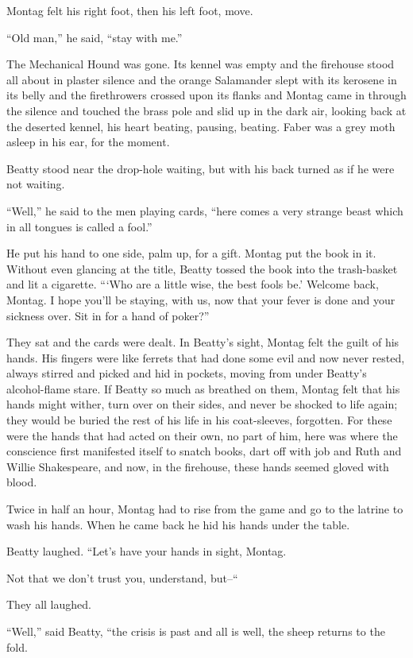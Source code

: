 \documentclass[11pt,openany]{book}
\begin{document}
Montag felt his right foot, then his left foot, move.

``Old man,'' he said, ``stay with me.''

The Mechanical Hound was gone. Its kennel was empty and the firehouse stood all about in plaster silence and the orange Salamander slept with its kerosene in its belly and the firethrowers crossed upon its flanks and Montag came in through the silence and touched the brass pole and slid up in the dark air, looking back at the deserted kennel, his heart beating, pausing, beating. Faber was a grey moth asleep in his ear, for the moment.

Beatty stood near the drop-hole waiting, but with his back turned as if he were not waiting.

``Well,'' he said to the men playing cards, ``here comes a very strange beast which in all tongues is called a fool.''

He put his hand to one side, palm up, for a gift. Montag put the book in it. Without even glancing at the title, Beatty tossed the book into the trash-basket and lit a cigarette. ```Who are a little wise, the best fools be.' Welcome back, Montag. I hope you'll be staying, with us, now that your fever is done and your sickness over. Sit in for a hand of poker?''

They sat and the cards were dealt. In Beatty's sight, Montag felt the guilt of his hands. His fingers were like ferrets that had done some evil and now never rested, always stirred and picked and hid in pockets, moving from under Beatty's alcohol-flame stare. If Beatty so much as breathed on them, Montag felt that his hands might wither, turn over on their sides, and never be shocked to life again; they would be buried the rest of his life in his coat-sleeves, forgotten. For these were the hands that had acted on their own, no part of him, here was where the conscience first manifested itself to snatch books, dart off with job and Ruth and Willie Shakespeare, and now, in the firehouse, these hands seemed gloved with blood.

Twice in half an hour, Montag had to rise from the game and go to the latrine to wash his hands. When he came back he hid his hands under the table.

Beatty laughed. ``Let's have your hands in sight, Montag.

Not that we don't trust you, understand, but--``

They all laughed.

``Well,'' said Beatty, ``the crisis is past and all is well, the sheep returns to the fold.
\end{document}
